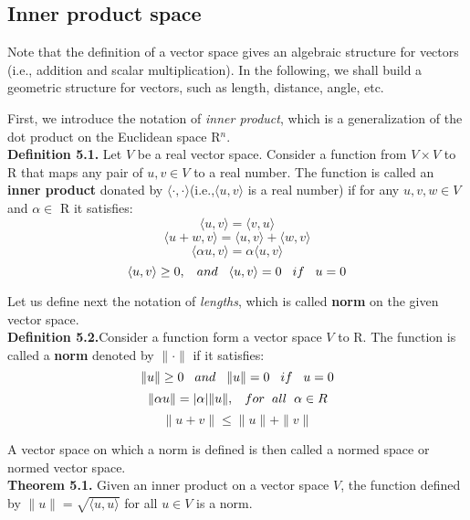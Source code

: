 \documentclass[12pt]{article} %
\begin{document}
\subsection{Inner product space}
\hspace{5mm}
Note that the definition of a vector space gives an algebraic structure for vectors (i.e., addition and scalar multiplication). In the following, we shall build a geometric structure for vectors, such as length, distance, angle, etc.\par
First, we introduce the notation of \textit{inner product}, which is a generalization of  the dot product on the Euclidean space R$^{n}$.\\
\textbf{Definition 5.1.} Let $V$ be a real vector space. Consider a function from $V \times V$ to R that maps any pair of $u, v \in V$ to a real number. The function is called an \textbf{inner product} donated by $\langle \cdot, \cdot \rangle $(i.e.,$\langle u, v \rangle $ is a real number) if for any $u, v, w \in V$ and $\alpha \in$ R it satisfies:
$$
\langle u, v \rangle  = \langle v, u \rangle 
$$ 
$$
\langle u+w, v \rangle = \langle u, v \rangle + \langle w, v \rangle 
$$
$$
\langle \alpha u, v \rangle = \alpha \langle u, v \rangle 
$$
$$
\langle u, v \rangle \ge0,   \hspace{3mm}and \hspace{3mm}   \langle u, v \rangle  = 0 \hspace{3mm} if  \hspace{3mm}u=0
$$\par
Let us define next the notation of \textit{lengths}, which is called \textbf{norm} on the given vector space. \\
\textbf{Definition 5.2.}Consider a function form a vector space $V$ to R. The function is called a \textbf{norm} denoted by $\| \cdot \|$ if it satisfies:
$$
\| u\| \ge0\hspace{3mm}and \hspace{3mm} \| u\|=0\hspace{3mm} if  \hspace{3mm}u=0
$$
$$
\|\alpha u\| = |\alpha|\| u\| , \hspace{3mm} for\hspace{2mm} all\hspace{2mm} \alpha \in R
$$
$$
\| u+v\| \le \| u\|+\| v\|
$$\par
A vector space on which a norm is defined is then called a normed space or normed vector space.\\
\textbf{Theorem 5.1.} Given an inner product on a vector space $V$, the function defined by $\|u\| = \sqrt{\langle u, u \rangle}$ for all $u \in V$ is a norm. \\
\end{document}
